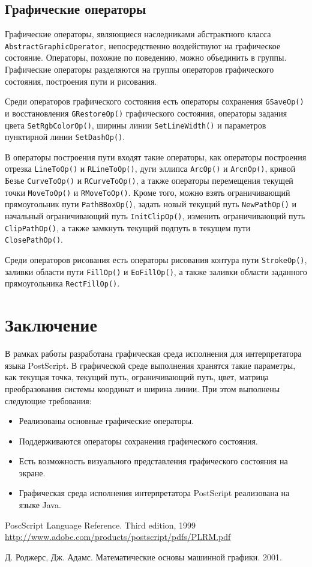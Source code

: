 \subsection{Графические операторы}
\sloppy

Графические операторы, являющиеся наследниками абстрактного класса \texttt{AbstractGraphicOperator}, непосредственно воздействуют на графическое состояние.
Операторы, похожие по поведению, можно объединить в группы. Графические операторы разделяются на группы операторов графического состояния, построения пути и рисования. 

Среди операторов графического состояния есть операторы сохранения \texttt{GSaveOp()} и восстановления \texttt{GRestoreOp()} графического состояния, операторы задания цвета \texttt{SetRgbColorOp()}, ширины линии \texttt{SetLineWidth()} и параметров пунктирной линии \texttt{SetDashOp()}.

В операторы построения пути входят такие операторы, как операторы построения отрезка \texttt{LineToOp()} и \texttt{RLineToOp()}, дуги эллипса \texttt{ArcOp()} и \texttt{ArcnOp()}, кривой Безье \texttt{CurveToOp()} и \texttt{RCurveToOp()}, а также операторы перемещения текущей точки \texttt{MoveToOp()} и \texttt{RMoveToOp()}. Кроме того, можно взять ограничивающий прямоугольник пути \texttt{PathBBoxOp()}, задать новый текущий путь \texttt{NewPathOp()} и начальный ограничивающий путь \texttt{InitClipOp()}, изменить ограничивающий путь \texttt{ClipPathOp()}, а также замкнуть текущий подпуть в текущем пути \texttt{ClosePathOp()}.

Среди операторов рисования есть операторы рисования контура пути \texttt{StrokeOp()}, заливки области пути \texttt{FillOp()} и \texttt{EoFillOp()}, а также заливки области заданного прямоугольника \texttt{RectFillOp()}. 


\section*{Заключение}

В рамках работы разработана графическая среда исполнения для интерпретатора языка PostScript. В графической среде выполнения хранятся такие параметры, как текущая точка, текущий путь, ограничивающий путь,  цвет,  матрица преобразования системы координат и ширина линии. 
При этом выполнены следующие требования:
\begin{itemize}
\item Реализованы основные графические операторы.
\item Поддерживаются операторы сохранения графического состояния.
\item Есть возможность визуального представления графического состояния на 
    экране.
\item Графическая среда исполнения интерпретатора PostScript реализована на языке Java.
\end{itemize}


\begin{thebibliography}{99}
PoscScript Language Reference. Third edition, 1999
\\
\url{http://www.adobe.com/products/postscript/pdfs/PLRM.pdf}

Д. Роджерс, Дж. Адамс. Математические основы машинной графики. 2001. 

\end{thebibliography}

